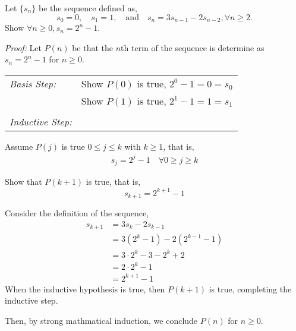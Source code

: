 \begin{questions}




 Let $\{s_n\}$ be the sequence defined as, 
\[ s_0 = 0, \quad s_1 = 1,  \quad \text{and} \quad s_n = 3s_{n-1} - 2s_{n-2}, \forall n \geq 2. \]
Show $\forall n \geq 0, s_n = 2^n - 1 .$
    \ifprintanswers
        \vspace{-10pt}
   \fi
\begin{solution}
  \textit{Proof:}
  Let $P(n)$ be that the $n$th term of the sequence is determine as $s_n = 2^n - 1$ for $n \geq 0$.

  \smallskip
  \begin{tabular}{lp{4in}}
    \textit{Basis Step:}  & Show $P(0)$ is true, $2^0 - 1 = 0 = s_0$ \\
                & Show $P(1)$ is true, $2^1 - 1 = 1 = s_1$ \\
     & \\
   \textit{Inductive Step:} &  \\
  \end{tabular}

  Assume $P(j)$ is true $0 \leq j \leq k$ with $k \geq 1$, that is, 
  \begin{align*}
    s_j = 2^j - 1 \quad \forall 0 \geq j \geq k \tag{IH}
  \end{align*}

  Show that $P(k+1)$ is true, that is,
  \[ s_{k+1} = 2^{k+1} - 1 \] 

  Consider the definition of the sequence, 
  \begin{align*}
    s_{k+1} &= 3s_{k} - 2s_{k-1} \\
    &= 3(2^k - 1) - 2(2^{k-1} - 1) \\
    &= 3\cdot 2^k - 3 - 2^k + 2 \\
    &= 2\cdot 2^k - 1 \\
    &= 2^{k+1} - 1
  \end{align*}
  When the inductive hypothesis is true, then $P(k+1)$ is true, completing the inductive step. 

  Then, by strong mathmatical induction, we conclude $P(n)$ for $n \geq 0$.
\end{solution}




\end{questions}
